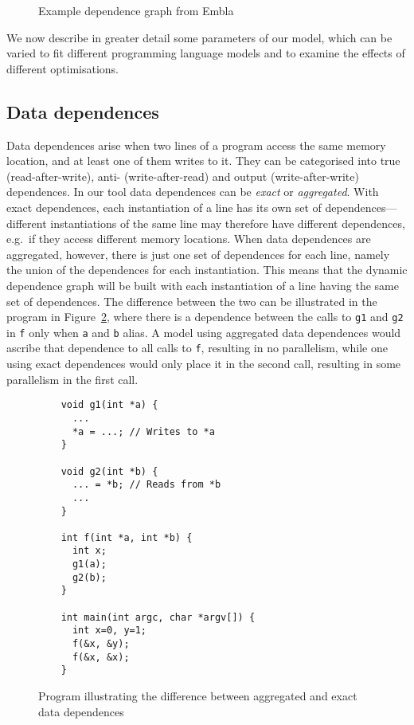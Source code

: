 \begin{figure}
  \begin{center}
  \small
  
  \end{center}
  \nocaptionrule \caption{Example dependence graph from Embla}
  \label{example-depgraph}
\end{figure}

We now describe in greater detail some parameters of our model, which can be varied to fit different programming language models and to examine the effects of different optimisations.

\subsection{Data dependences}
Data dependences arise when two lines of a program access the same memory location, and at least one of them writes to it.
They can be categorised into true (read-after-write), anti- (write-after-read) and output (write-after-write) dependences.
In our tool data dependences can be \emph{exact} or \emph{aggregated}.
With exact dependences, each instantiation of a line has its own set of dependences---different instantiations of the same line may therefore have different dependences, e.g.\ if they access different memory locations.
When data dependences are aggregated, however, there is just one set of dependences for each line, namely the union of the dependences for each instantiation.
This means that the dynamic dependence graph will be built with each instantiation of a line having the same set of dependences.
The difference between the two can be illustrated in the program in Figure~\ref{datadeps}, where there is a dependence between the calls to \texttt{g1} and \texttt{g2} in \texttt{f} only when \texttt{a} and \texttt{b} alias.
A model using aggregated data dependences would ascribe that dependence to all calls to \texttt{f}, resulting in no parallelism, while one using exact dependences would only place it in the second call, resulting in some parallelism in the first call.

\begin{figure}
  \begin{center}
  \small
  \begin{verbatim}
    void g1(int *a) {
      ...
      *a = ...; // Writes to *a
    }
  
    void g2(int *b) {
      ... = *b; // Reads from *b
      ...
    }

    int f(int *a, int *b) {
      int x;
      g1(a);
      g2(b);
    }

    int main(int argc, char *argv[]) {
      int x=0, y=1;
      f(&x, &y);
      f(&x, &x);
    }
  \end{verbatim}
  \end{center}
  \caption{Program illustrating the difference between aggregated and exact data dependences}
  \label{datadeps}
\end{figure}

